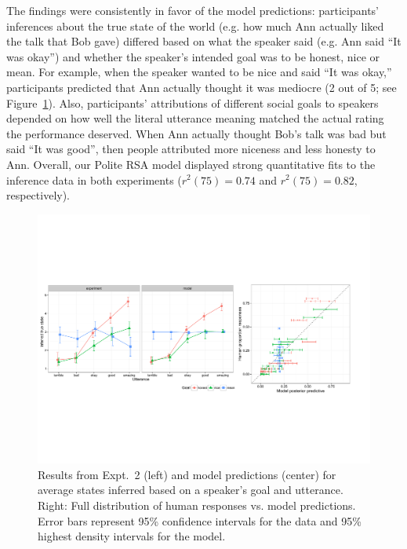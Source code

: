 The findings were consistently in favor of the model predictions: participants' inferences about the true state of the world (e.g. how much Ann actually liked the talk that Bob gave) differed based on what the speaker said (e.g. Ann said ``It was okay'') and whether the speaker's intended goal was to be honest, nice or mean. For example, when the speaker wanted to be nice and said ``It was okay,'' participants predicted that Ann actually thought it was mediocre (2 out of 5; see Figure~\ref{fig:expt2}). Also, participants' attributions of different social goals to speakers depended on how well the literal utterance meaning matched the actual rating the performance deserved. When Ann actually thought Bob's talk was bad but said ``It was good'', then people attributed more niceness and less honesty to Ann. Overall, our Polite RSA model displayed strong quantitative fits to the inference data in both experiments ($r^2(75) = 0.74$ and $r^2(75) = 0.82$, respectively).

\begin{figure}[h]
\begin{centering}
\includegraphics[width=\textwidth]{figures/exp2.pdf}
\caption{\label{fig:expt2} Results from Expt.~2 (left) and model predictions (center) for average states inferred based on a speaker's goal and utterance. Right: Full distribution of human responses vs. model predictions. Error bars represent 95\% confidence intervals for the data and 95\% highest density intervals for the model.}
\end{centering}
\end{figure}

